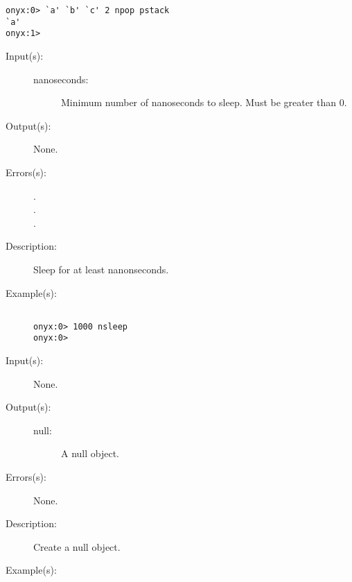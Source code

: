 \begin{description}
\begin{description}
\begin{verbatim}
onyx:0> `a' `b' `c' 2 npop pstack
`a'
onyx:1>
		\end{verbatim}
	\end{description}
\label{systemdict:nsleep}
\item[{\onyxop{nanoseconds}{nsleep}{--}}: ]
	\begin{description}\item[]
	\item[Input(s): ]
		\begin{description}\item[]
		\item[nanoseconds: ]
			Minimum number of nanoseconds to sleep.  Must be greater
			than 0.
		\end{description}
	\item[Output(s): ] None.
	\item[Errors(s): ]
		\begin{description}\item[]
		\item[.]
		\item[.]
		\item[.]
		\end{description}
	\item[Description: ]
		Sleep for at least  nanonseconds.
	\item[Example(s): ]\begin{verbatim}

onyx:0> 1000 nsleep
onyx:0>
		\end{verbatim}
	\end{description}
\label{systemdict:null}
\item[{\onyxop{--}{null}{null}}: ]
	\begin{description}\item[]
	\item[Input(s): ] None.
	\item[Output(s): ]
		\begin{description}\item[]
		\item[null: ]
			A null object.
		\end{description}
	\item[Errors(s): ] None.
	\item[Description: ]
		Create a null object.
	\item[Example(s): ]\begin{verbatim}


\end{verbatim}
\end{description}
\end{description}
